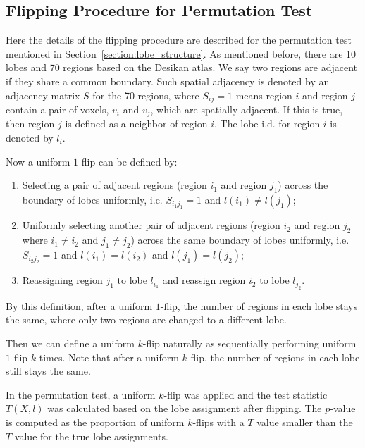 \documentclass[journal,twoside,web]{ieeecolor}
\begin{document}
\subsection{Flipping Procedure for Permutation Test}
\label{section:testing}
%
Here the details of the flipping procedure are described for the permutation test mentioned in Section~\ref{section:lobe_structure}.
As mentioned before, there are 10 lobes and 70 regions based on the Desikan atlas.
We say two regions are adjacent if they share a common boundary. Such spatial adjacency is denoted by an adjacency matrix $S$ for the 70 regions, where $S_{ij} = 1$ means region $i$ and region $j$ contain a pair of voxels, $v_i$ and $v_j$, which are spatially adjacent.
If this is true, then region $j$ is defined as a neighbor of region $i$.
The lobe i.d. for region $i$ is denoted by $l_i$.

Now a uniform $1$-flip can  be defined by:
\begin{enumerate}
\item Selecting a pair of adjacent regions (region $i_1$ and region $j_1$) across the boundary of lobes uniformly, i.e. $S_{i_1 j_1} = 1$ and $l(i_1) \ne l(j_1)$;
\item Uniformly selecting another pair of adjacent regions (region $i_2$ and region $j_2$ where $i_1 \ne i_2$ and $j_1 \ne j_2$) across the same boundary of lobes uniformly, i.e. $S_{i_2 j_2} = 1$ and $l(i_1) = l(i_2)$ and $l(j_1) = l(j_2)$;
\item Reassigning region $j_1$ to lobe $l_{i_1}$ and reassign region $i_2$ to lobe $l_{j_2}$.
\end{enumerate}

By this definition, after a uniform $1$-flip, the number of regions in each lobe stays the same, where only two regions are changed to a different lobe.

Then we can define a uniform $k$-flip naturally as sequentially performing uniform $1$-flip $k$ times.
Note that after a uniform $k$-flip, the number of regions in each lobe still stays the same.

In the permutation test, a uniform $k$-flip was applied and the test statistic $T(X, l)$ was calculated based on the lobe assignment after flipping.
The $p$-value is computed as the proportion of uniform $k$-flips with a $T$ value smaller than the $T$ value for the true lobe assignments.
\end{document}
